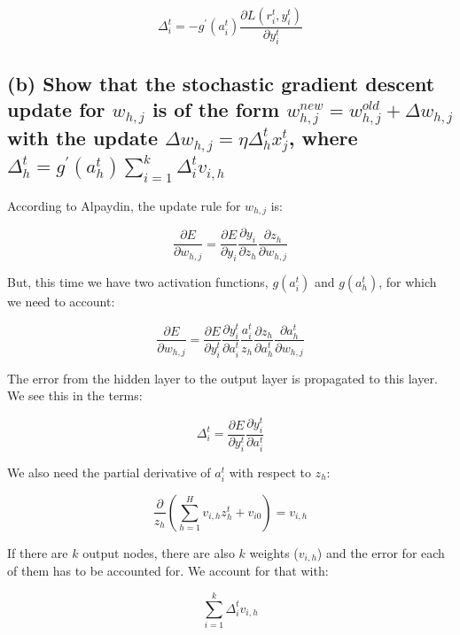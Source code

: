 \documentclass{article}
\begin{document}
\begin{equation}
\Delta_i^t = - g^{'}(a_i^t) \frac{ \partial L(r_i^t, y_i^t) }{ \partial y_i^t }
\end{equation}


\subsection{(b) Show that the stochastic gradient descent update for $w_{h,j}$ is of the form $w_{h,j}^{new} = w_{h,j}^{old} + \Delta w_{h,j}$ with the update $\Delta w_{h,j} = \eta \Delta_h^t x_j^t$, where $\Delta_h^t = g^{'}(a_h^t) \sum_{i=1}^k \Delta_i^t v_{i,h}$ }

According to Alpaydin, the update rule for $w_{h,j}$ is:

\begin{equation}
\frac{ \partial E }{ \partial w_{h,j} } = \frac{\partial E}{\partial y_i} \frac{\partial y_i}{\partial z_h} \frac{\partial z_h}{\partial w_{h,j}}
\end{equation}

But, this time we have two activation functions, $g ( a_i^t )$ and $g ( a_h^t )$, for which we need to account:

\begin{equation}
\frac{ \partial E }{ \partial w_{h,j} } = \frac{ \partial E }{ \partial y_i^t }  \frac{ \partial y_i^t }{ \partial a_i^t }  \frac{ a_i^t }{ z_h }  \frac{ \partial z_h }{ \partial a_h^t }  \frac{ \partial a_h^t }{ \partial w_{h,j} }
\end{equation}

The error from the hidden layer to the output layer is propagated to this layer.  We see this in the terms:

\begin{equation}
\Delta_i^t = \frac{ \partial E }{ \partial y_i^t }  \frac{ \partial y_i^t }{ \partial a_i^t }
\end{equation}

We also need the partial derivative of $a_i^t$ with respect to $z_h$:

\begin{equation}
\frac{\partial}{z_h} ( \sum\limits_{h=1}^H v_{i,h} z_h^t + v_{i0} ) = v_{i,h}
\end{equation}

If there are $k$ output nodes, there are also $k$ weights ($v_{i,h}$) and the error for each of them has to be accounted for.  We account for that with:

\begin{equation}
\sum_{i=1}^k \Delta_i^t v_{i,h}
\end{equation}
\end{document}
